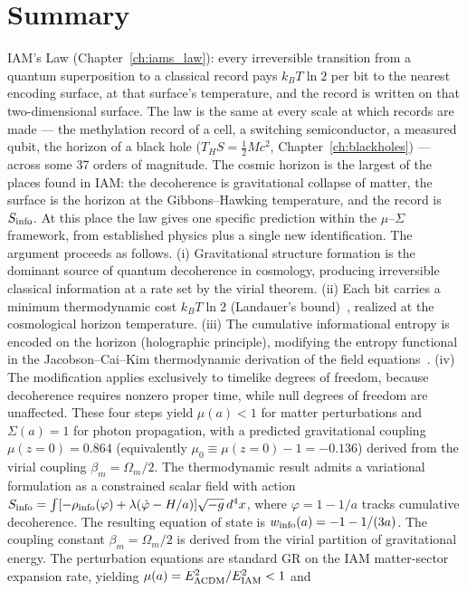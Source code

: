 \section*{Summary}
IAM's Law (Chapter~\ref{ch:iams_law}): every irreversible transition from a quantum superposition to a classical record pays $k_BT\ln2$ per bit
to the nearest encoding surface, at that surface's temperature, and the record is written on that two-dimensional surface. The law is the same at
every scale at which records are made --- the methylation record of a cell, a switching semiconductor, a measured qubit, the horizon of a black hole
($T_HS=\tfrac12Mc^2$, Chapter~\ref{ch:blackholes}) --- across some 37 orders of magnitude. The cosmic horizon is the largest of the places found in IAM: the decoherence is gravitational
collapse of matter, the surface is the horizon at the Gibbons--Hawking temperature, and the record is $S_{\rm info}$. At this place the law gives one
specific prediction within the $\mu$--$\Sigma$ framework, from established physics plus a single new identification.
The argument proceeds as follows.
(i) Gravitational structure formation is the dominant source of quantum decoherence in cosmology, producing irreversible classical information at a rate
set by the virial theorem. (ii) Each bit carries a minimum thermodynamic cost $k_BT\ln2$ (Landauer's bound)~\cite{Landauer1961}, realized at the cosmological horizon temperature.
(iii) The cumulative informational entropy is encoded on the horizon (holographic principle), modifying the entropy functional in the Jacobson--Cai--Kim
thermodynamic derivation of the field equations~\cite{Jacobson1995,CaiKim2005}. (iv) The modification applies exclusively to timelike degrees of freedom, because decoherence requires
nonzero proper time, while null degrees of freedom are unaffected.
These four steps yield $\mu(a)<1$ for matter perturbations and $\Sigma(a)=1$ for photon propagation, with a predicted gravitational coupling
$\mu(z{=}0)=0.864$ (equivalently $\mu_0\equiv\mu(z{=}0)-1=-0.136$) derived from the virial coupling $\beta_m=\Omega_m/2$. The thermodynamic result
admits a variational formulation as a constrained scalar field with action
$S_{\rm info}=\int[-\rho_{\rm info}(\varphi)+\lambda(\dot\varphi-H/a)]\sqrt{-g}\,d^4x$, where $\varphi=1-1/a$ tracks cumulative decoherence. The resulting
equation of state is $w_{\rm info}(a)=-1-1/(3a)$. The coupling constant $\beta_m=\Omega_m/2$ is derived from the virial partition of gravitational energy.
The perturbation equations are standard GR on the IAM matter-sector expansion rate, yielding $\mu(a)=E^2_{\Lambda\rm CDM}/E^2_{\rm IAM}<1$ and
